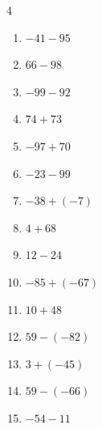 \begin{multicols}{4}
\begin{enumerate}
        \phantom{$=-9$}

  \item $-41-95$

        \phantom{$=-136$}

  \item $66-98$

        \phantom{$=-32$}

  \item $-99-92$

        \phantom{$=-191$}

  \item $74+73$

        \phantom{$=147$}

  \item $-97+70$

        \phantom{$=-27$}

  \item $-23-99$

        \phantom{$=-122$}

  \item $-38+(-7)$

        \phantom{$=-45$}

  \item $4+68$

        \phantom{$=72$}

  \item $12-24$

        \phantom{$=-12$}

  \item $-85+(-67)$

        \phantom{$=-152$}

  \item $10+48$

        \phantom{$=58$}

  \item $59-(-82)$

        \phantom{$=141$}

  \item $3+(-45)$

        \phantom{$=-42$}

\columnbreak %

\resetques

  \item $59-(-66)$

        \phantom{$=125$}

  \item $-54-11$

        \phantom{$=-65$}


\end{enumerate}
\end{multicols}
